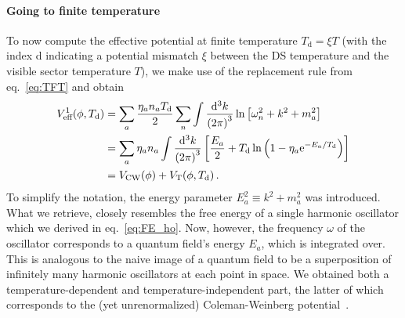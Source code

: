 \paragraph{Going to finite temperature} To now compute the effective potential at finite temperature $T_\text{d} = \xi T$ (with the index d indicating a potential mismatch $\xi$ between the \ac{DS} temperature and the visible sector temperature $T$), we make use of the replacement rule from eq.~\eqref{eq:TFT} and obtain
\begin{align}
	V_\text{eff}^1(\phi, T_\text{d}) &= \sum_a \frac{\eta_a n_a T_\text{d}}{2} \sum_n \int \frac{\mathop{}\!\mathrm{d}^3 k}{\left( 2  \pi \right)^3} \ln \left[ \omega_n^2 + k^2 + m^2_a \right] \nonumber\\
	&= \sum_a \eta_a n_a  \int \frac{\mathop{}\!\mathrm{d}^3 k}{\left( 2 \pi \right)^3} \left[ \frac{E_a}{2} + T_\text{d} \ln \left( 1 - \eta_a \mathrm{e}^{- E_a /T_\mathrm{d}} \right) \right] \nonumber\\
	&= V_\text{CW}(\phi) + V_\text{T}(\phi, T_\text{d})  \, .
	\label{eq:Veffbeforereno}
\end{align}
To simplify the notation, the energy parameter $E_a^2 \equiv k^2 + m^2_a$ was introduced.  What we retrieve, closely resembles the free energy of a single harmonic oscillator which we derived in eq.~\eqref{eq:FE_ho}. Now,  however, the frequency $\omega$ of the oscillator corresponds to a quantum field's energy $E_a$, which is integrated over. This is analogous to the naive image of a quantum field to be a superposition of infinitely many harmonic oscillators at each point in space. We obtained both a temperature-dependent and temperature-independent part, the latter of which corresponds to the (yet unrenormalized) Coleman-Weinberg potential~\cite{Coleman:1973jx}. 

